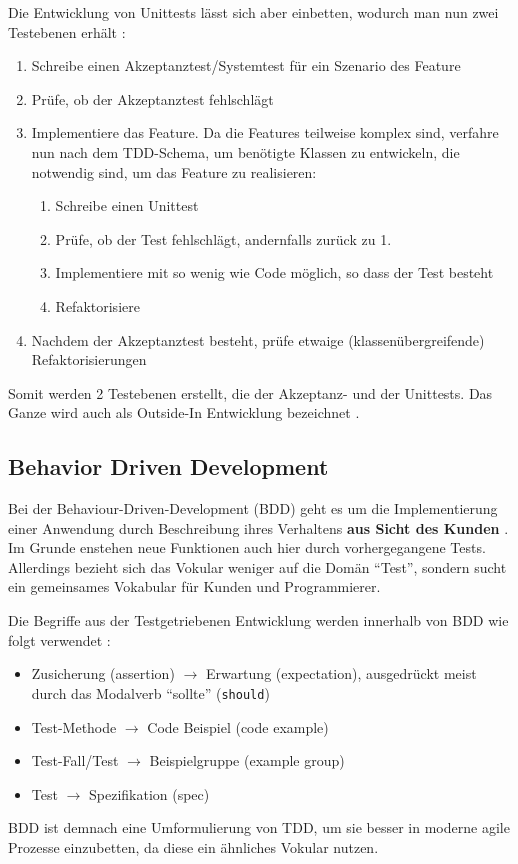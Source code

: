 Die Entwicklung von Unittests lässt sich aber einbetten, wodurch man nun zwei Testebenen erhält \citep[S. 285]{chelimsky_rspec_2010}:

\begin{enumerate}
 \item Schreibe einen Akzeptanztest/Systemtest für ein Szenario des Feature
 \item Prüfe, ob der Akzeptanztest fehlschlägt
 \item Implementiere das Feature. Da die Features teilweise komplex sind, verfahre nun nach dem TDD-Schema, um benötigte Klassen zu entwickeln, die notwendig sind, um das Feature zu realisieren:
  \begin{enumerate}
   \item Schreibe einen Unittest
   \item Prüfe, ob der Test fehlschlägt, andernfalls zurück zu 1.
   \item Implementiere mit so wenig wie Code möglich, so dass der Test besteht
   \item Refaktorisiere
  \end{enumerate}
 \item Nachdem der Akzeptanztest besteht, prüfe etwaige (klassenübergreifende) Refaktorisierungen
\end{enumerate}

Somit werden 2 Testebenen erstellt, die der Akzeptanz- und der Unittests. Das Ganze wird auch als Outside-In Entwicklung bezeichnet \citep{chelimsky_rspec_2010}.

\subsection{Behavior Driven Development}

Bei der Behaviour-Driven-Development (BDD) geht es um die Implementierung einer Anwendung durch Beschreibung ihres Verhaltens \textbf{aus Sicht des Kunden} \citep[S. 138]{chelimsky_rspec_2010}. Im Grunde enstehen neue Funktionen auch hier durch vorhergegangene Tests. Allerdings bezieht sich das Vokular weniger auf die Domän "`Test"', sondern sucht ein gemeinsames Vokabular für Kunden und Programmierer.

Die Begriffe aus der Testgetriebenen Entwicklung werden innerhalb von BDD wie folgt verwendet \citep[S. 151]{chelimsky_rspec_2010}:
\begin{itemize}
 \item Zusicherung (assertion) $\to$ Erwartung (expectation), ausgedrückt meist durch das Modalverb "`sollte"' (\texttt{should})
 \item Test-Methode $\to$ Code Beispiel (code example)
 \item Test-Fall/Test $\to$ Beispielgruppe (example group)
 \item Test $\to$ Spezifikation (spec)
\end{itemize}
BDD ist demnach eine Umformulierung von TDD, um sie besser in moderne agile Prozesse einzubetten, da diese ein ähnliches Vokular nutzen.

